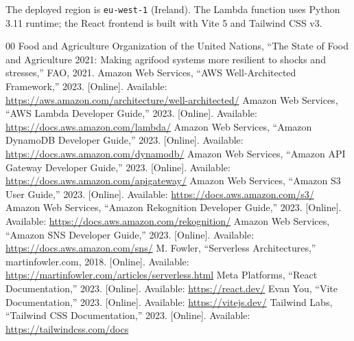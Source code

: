 \documentclass[conference]{IEEEtran}
\begin{document}
The deployed region is \texttt{eu-west-1} (Ireland). The Lambda function uses Python 3.11 runtime; the React frontend is built with Vite 5 and Tailwind CSS v3.

\begin{thebibliography}{00}
 Food and Agriculture Organization of the United Nations, ``The State of Food and Agriculture 2021: Making agrifood systems more resilient to shocks and stresses,'' FAO, 2021.
 Amazon Web Services, ``AWS Well-Architected Framework,'' 2023. [Online]. Available: \url{https://aws.amazon.com/architecture/well-architected/}
 Amazon Web Services, ``AWS Lambda Developer Guide,'' 2023. [Online]. Available: \url{https://docs.aws.amazon.com/lambda/}
 Amazon Web Services, ``Amazon DynamoDB Developer Guide,'' 2023. [Online]. Available: \url{https://docs.aws.amazon.com/dynamodb/}
 Amazon Web Services, ``Amazon API Gateway Developer Guide,'' 2023. [Online]. Available: \url{https://docs.aws.amazon.com/apigateway/}
 Amazon Web Services, ``Amazon S3 User Guide,'' 2023. [Online]. Available: \url{https://docs.aws.amazon.com/s3/}
 Amazon Web Services, ``Amazon Rekognition Developer Guide,'' 2023. [Online]. Available: \url{https://docs.aws.amazon.com/rekognition/}
 Amazon Web Services, ``Amazon SNS Developer Guide,'' 2023. [Online]. Available: \url{https://docs.aws.amazon.com/sns/}
 M. Fowler, ``Serverless Architectures,'' martinfowler.com, 2018. [Online]. Available: \url{https://martinfowler.com/articles/serverless.html}
 Meta Platforms, ``React Documentation,'' 2023. [Online]. Available: \url{https://react.dev/}
 Evan You, ``Vite Documentation,'' 2023. [Online]. Available: \url{https://vitejs.dev/}
 Tailwind Labs, ``Tailwind CSS Documentation,'' 2023. [Online]. Available: \url{https://tailwindcss.com/docs}
\end{thebibliography}
\end{document}
